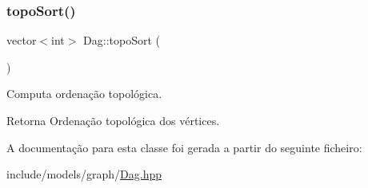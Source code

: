 \subsubsection{\texorpdfstring{topoSort()}{topoSort()}}
{\footnotesize\ttfamily vector$<$int$>$ Dag\+::topo\+Sort (\begin{DoxyParamCaption}{ }\end{DoxyParamCaption})}

Computa ordenação topológica. \begin{DoxyReturn}{Retorna}
Ordenação topológica dos vértices. 
\end{DoxyReturn}


A documentação para esta classe foi gerada a partir do seguinte ficheiro\+:\begin{DoxyCompactItemize}
\item 
include/models/graph/\mbox{\hyperlink{Dag_8hpp}{Dag.\+hpp}}\end{DoxyCompactItemize}
